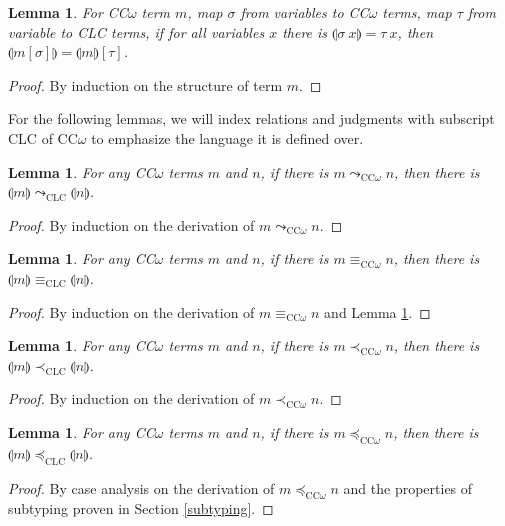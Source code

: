 \documentclass{article}
\newtheorem{lemma}[theorem]{Lemma}
\theoremstyle{definition}
\newcommand{\step}{\leadsto}
\newcommand{\lift}[1]{\llparenthesis #1 \rrparenthesis}
\begin{document}
\begin{lemma}
  For CC$\omega$ term $m$, map $\sigma$ from variables to CC$\omega$ terms, map $\tau$ from variable to CLC terms, if for all variables $x$ there is $\lift{\sigma\ x} = \tau\ x$, then $\lift{m[\sigma]} = \lift{m}[\tau]$.
\end{lemma}
\begin{proof}
  By induction on the structure of term $m$.
\end{proof}
For the following lemmas, we will index relations and judgments with subscript CLC of CC$\omega$ to emphasize the language it is defined over.

\begin{lemma}\label{liftstep}
  For any CC$\omega$ terms $m$ and $n$, if there is $m \step_{\scriptscriptstyle \text{CC$\omega$}} n$, then there is $\lift{m} \step_{\scriptscriptstyle \text{CLC}} \lift{n}$.
\end{lemma}
\begin{proof}
  By induction on the derivation of $m \step_{\scriptscriptstyle \text{CC$\omega$}} n$.
\end{proof}

\begin{lemma}
  For any CC$\omega$ terms $m$ and $n$, if there is $m \equiv_{\scriptscriptstyle \text{CC$\omega$}} n$, then there is $\lift{m} \equiv_{\scriptscriptstyle \text{CLC}} \lift{n}$.
\end{lemma}
\begin{proof}
  By induction on the derivation of $m \equiv_{\scriptscriptstyle \text{CC$\omega$}} n$ and Lemma \ref{liftstep}.
\end{proof}

\begin{lemma}\label{liftsub1}
  For any CC$\omega$ terms $m$ and $n$, if there is $m \prec_{\scriptscriptstyle \text{CC$\omega$}} n$, then there is $\lift{m} \prec_{\scriptscriptstyle \text{CLC}} \lift{n}$.
\end{lemma}
\begin{proof}
  By induction on the derivation of $m \prec_{\scriptscriptstyle \text{CC$\omega$}} n$.
\end{proof}

\begin{lemma}
  For any CC$\omega$ terms $m$ and $n$, if there is $m \preceq_{\scriptscriptstyle \text{CC$\omega$}} n$, then there is $\lift{m} \preceq_{\scriptscriptstyle \text{CLC}} \lift{n}$.
\end{lemma}
\begin{proof}
  By case analysis on the derivation of $m \preceq_{\scriptscriptstyle \text{CC$\omega$}} n$ and the properties of subtyping proven in Section \ref{subtyping}.
\end{proof}
\end{document}

